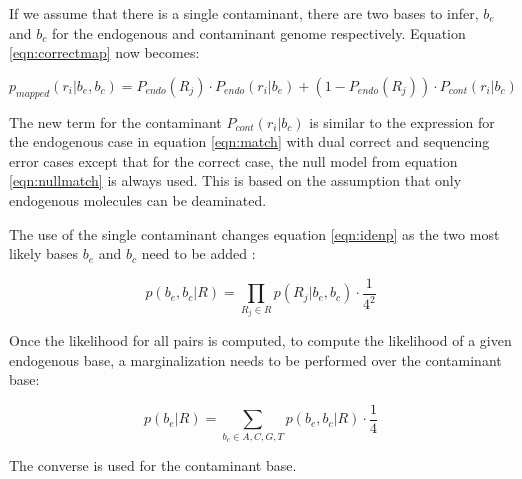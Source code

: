 \documentclass[a4paper,12pt]{article}
\begin{document}
\begin{itemize}
\begin{itemize}
If we assume that there is a single contaminant, there are two bases to infer, $b_e$ and $b_c$ for the endogenous and contaminant genome respectively. Equation \ref{eqn:correctmap} now becomes:

\begin{equation}
p_{mapped}(r_i|b_e,b_c) =  P_{endo}(R_j) \cdot P_{endo} (r_i|b_e)   + (1-P_{endo}(R_j)) \cdot P_{cont} (r_i|b_c)
\end{equation}

\noindent The new term for the contaminant $P_{cont} (r_i|b_c)$ is similar to the expression for the endogenous case in equation \ref{eqn:match} with dual correct and sequencing error cases except that for the correct case, the null model from equation \ref{eqn:nullmatch} is always used. This is based on the assumption that only endogenous molecules can be deaminated. 

The use of the single contaminant changes equation \ref{eqn:idenp} as the two most likely bases $b_e$ and $b_c$ need to be added :

\begin{equation}
  p(b_e,b_c|R)   = \prod_{R_j \in R} p(R_j|b_e,b_c) \cdot \frac {1} {4^2} 
\end{equation} 

\noindent Once the likelihood for all pairs is computed, to compute the likelihood of a given endogenous base, a marginalization needs to be performed over the contaminant base: 

\begin{equation}
  p(b_e|R)   = \sum_{b_c \in {A,C,G,T}} p(b_e,b_c|R) \cdot \frac {1} {4} 
\end{equation} 

\noindent The converse is used for the contaminant base. 


























\end{itemize}
\end{itemize}
\end{document}
